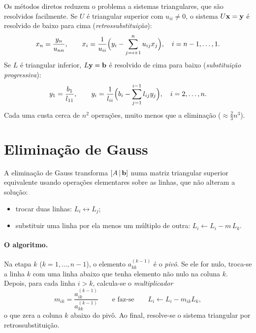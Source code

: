 Os métodos diretos reduzem o problema a sistemas triangulares, que são resolvidos facilmente.
Se $U$ é triangular superior com $u_{ii}\neq0$, o sistema $U\mathbf{x}=\mathbf{y}$ é resolvido de baixo para
cima (\emph{retrossubstituição}):
\[
x_n=\frac{y_n}{u_{nn}},\qquad
x_i=\frac{1}{u_{ii}}\Bigl(y_i-\sum_{j=i+1}^{n}u_{ij}x_j\Bigr),\quad i=n-1,\dots,1.
\]
Se $L$ é triangular inferior, $L\mathbf{y}=\mathbf{b}$ é resolvido de cima para baixo (\emph{substituição
progressiva}):
\[
y_1=\frac{b_1}{l_{11}},\qquad
y_i=\frac{1}{l_{ii}}\Bigl(b_i-\sum_{j=1}^{i-1}l_{ij}y_j\Bigr),\quad i=2,\dots,n.
\]
Cada uma custa cerca de $n^2$ operações, muito menos que a eliminação ($\approx\frac23n^3$).

\section{Eliminação de Gauss}

A eliminação de Gauss transforma $[A\,|\,\mathbf{b}]$ numa matriz triangular superior equivalente
usando operações elementares sobre as linhas, que não alteram a solução:
\begin{itemize}[nosep]
  \item trocar duas linhas: $L_i\leftrightarrow L_j$;
  \item substituir uma linha por ela menos um múltiplo de outra: $L_i\leftarrow L_i-m\,L_k$.
\end{itemize}

\paragraph{O algoritmo.} Na etapa $k$ ($k=1,\dots,n-1$), o elemento $a^{(k-1)}_{kk}$ é o
\emph{pivô}. Se ele for nulo, troca-se a linha $k$ com uma linha abaixo que tenha elemento não
nulo na coluna $k$. Depois, para cada linha $i>k$, calcula-se o \emph{multiplicador}
\[
m_{ik}=\frac{a^{(k-1)}_{ik}}{a^{(k-1)}_{kk}}
\qquad\text{e faz-se}\qquad L_i\leftarrow L_i-m_{ik}L_k,
\]
o que zera a coluna $k$ abaixo do pivô. Ao final, resolve-se o sistema triangular por
retrossubstituição.

